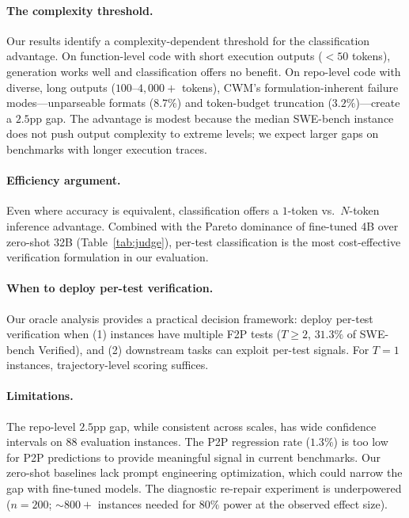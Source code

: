 \documentclass[11pt,a4paper]{article}
\begin{document}
\paragraph{The complexity threshold.} Our results identify a complexity-dependent threshold for the classification advantage. On function-level code with short execution outputs ($<50$ tokens), generation works well and classification offers no benefit. On repo-level code with diverse, long outputs ($100$--$4{,}000+$ tokens), CWM's formulation-inherent failure modes---unparseable formats ($8.7\%$) and token-budget truncation ($3.2\%$)---create a $2.5$pp gap. The advantage is modest because the median SWE-bench instance does not push output complexity to extreme levels; we expect larger gaps on benchmarks with longer execution traces.

\paragraph{Efficiency argument.} Even where accuracy is equivalent, classification offers a $1$-token vs.\ $N$-token inference advantage. Combined with the Pareto dominance of fine-tuned 4B over zero-shot 32B (Table~\ref{tab:judge}), per-test classification is the most cost-effective verification formulation in our evaluation.

\paragraph{When to deploy per-test verification.} Our oracle analysis provides a practical decision framework: deploy per-test verification when (1) instances have multiple F2P tests ($T{\geq}2$, $31.3\%$ of SWE-bench Verified), and (2) downstream tasks can exploit per-test signals. For $T{=}1$ instances, trajectory-level scoring suffices.

\paragraph{Limitations.} The repo-level $2.5$pp gap, while consistent across scales, has wide confidence intervals on $88$ evaluation instances. The P2P regression rate ($1.3\%$) is too low for P2P predictions to provide meaningful signal in current benchmarks. Our zero-shot baselines lack prompt engineering optimization, which could narrow the gap with fine-tuned models. The diagnostic re-repair experiment is underpowered ($n{=}200$; ${\sim}800+$ instances needed for $80\%$ power at the observed effect size).
\end{document}
